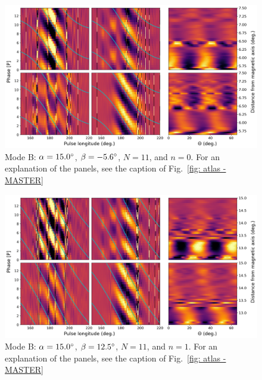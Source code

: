 \begin{figure}
	\begin{center}
		\includegraphics[width=\atlasHeightFrac\textwidth]{Figures/B0031/atlas/B_517015011000_plots}
		\caption[Atlas results: Mode B -- $\alpha=15.0\degr$, $\beta=-5.6\degr$, $N=11$, $n=0$]{Mode B: $\alpha=15.0\degr$, $\beta=-5.6\degr$, $N=11$, and $n=0$. For an explanation of the panels, see the caption of Fig.~\ref{fig: atlas - MASTER} }
		\label{fig: atlas - B_517015011000}
	\end{center}
\end{figure}

\begin{figure}
	\begin{center}
		\includegraphics[width=\atlasHeightFrac\textwidth]{Figures/B0031/atlas/B_517015011001_plots}
		\caption[Atlas results: Mode B -- $\alpha=15.0\degr$, $\beta=12.5\degr$, $N=11$, $n=1$]{Mode B: $\alpha=15.0\degr$, $\beta=12.5\degr$, $N=11$, and $n=1$. For an explanation of the panels, see the caption of Fig.~\ref{fig: atlas - MASTER} }
		\label{fig: atlas - B_517015011001}
	\end{center}
\end{figure}

